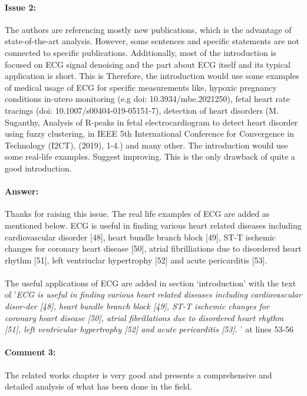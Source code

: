 \documentclass{article}
\begin{document}
\paragraph{Issue 2:}
\begin{displayquote}
The authors are referencing mostly new publications, which is the advantage of state-of-the-art analysis. However, some sentences and specific statements are not connected to specific publications.
Additionally, most of the introduction is focused on ECG signal denoising and the part about ECG itself and its typical application is short. This is Therefore, the introduction would use some examples of medical usage of ECG for specific measurements like, hypoxic pregnancy conditions in-utero monitoring (e.g doi: 10.3934/mbe.2021250), fetal heart rate tracings (doi: 10.1007/s00404-019-05151-7), detection of heart disorders (M. Suganthy, Analysis of R-peaks in fetal electrocardiogram to detect heart disorder using fuzzy clustering, in IEEE 5th International Conference for Convergence in Technology (I2CT), (2019), 1-4.) and many other. The introduction would use some real-life examples. Suggest improving. This is the only drawback of quite a good introduction.
\end{displayquote}

\paragraph{Answer:}
Thanks for raising this issue. The real life examples of ECG are added as mentioned below.
ECG is useful in finding various heart related diseases including cardiovascular disorder [48], heart bundle branch block [49], ST-T ischemic changes for coronary heart disease [50], atrial fibrilliations due to disordered heart rhythm [51], left ventriuclar hypertrophy [52] and acute pericarditis [53]. \\\\

The useful applications of ECG are added in section `introduction' with the text of '\textit{ECG is useful in finding various heart related diseases including cardiovascular disor-der [48], heart bundle branch block [49], ST-T ischemic changes for coronary heart disease [50], atrial fibrillations due to disordered heart rhythm [51], left ventricular hypertrophy [52] and acute pericarditis [53]. }' at lines 53-56

\paragraph{Comment 3:}
\begin{displayquote}
The related works chapter is very good and presents a comprehensive and detailed analysis of what has been done in the field.
\end{displayquote}
\end{document}
